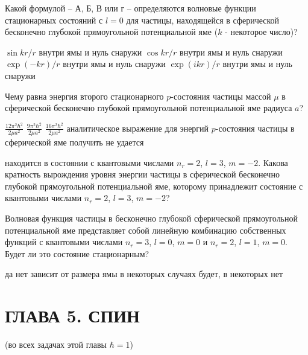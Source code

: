 \documentclass[11pt,a4paper]{exam}
\begin{document}
\begin{questions}
\question Какой формулой – А, Б, В или г – определяются волновые функции стационарных состояний с $l = 0$ для частицы, находящейся в сферической бесконечно глубокой прямоугольной потенциальной яме ($k$ - некоторое число)?
\begin{choices}
\choice $\sin kr/r$ внутри ямы и нуль снаружи        
\choice $\cos kr/r$ внутри ямы и нуль снаружи
\choice $\exp ( - kr)/r$ внутри ямы и нуль снаружи         
\choice $\exp (ikr)/r$ внутри ямы и нуль снаружи
\end{choices}

\question  Чему равна энергия второго стационарного $p$-состояния частицы массой $\mu $ в сферической бесконечно глубокой прямоугольной потенциальной яме радиуса $a$?
\begin{choices}
\choice $\frac{{12{\pi ^2}{\hbar ^2}}}{{2\mu {a^2}}}$         
\choice $\frac{{9{\pi ^2}{\hbar ^2}}}{{2\mu {a^2}}}$       
\choice $\frac{{16{\pi ^2}{\hbar ^2}}}{{2\mu {a^2}}}$
\choice аналитическое выражение для энергий $p$-состояния частицы в сферической яме получить не удается
\end{choices}

\question находится в состоянии с квантовыми числами ${n_r} = 2$, $l = 3$, $m =  - 2$. Какова кратность вырождения уровня энергии частицы в сферической бесконечно глубокой прямоугольной потенциальной яме, которому принадлежит состояние с квантовыми числами ${n_r} = 2$, $l = 3$, $m =  - 2$?
\begin{choices}
\end{choices}

\question Волновая функция частицы в бесконечно глубокой сферической прямоугольной потенциальной яме представляет собой линейную комбинацию собственных функций с квантовыми числами ${n_r} = 3$, $l = 0$, $m = 0$ и ${n_r} = 2$, $l = 1$, $m = 0$. Будет ли это состояние стационарным?
\begin{choices}
\choice да          
\choice нет            
\choice зависит от размера ямы
\choice в некоторых случаях будет, в некоторых нет
\end{choices}

\end{questions}


\section{ ГЛАВА 5. СПИН }
(во всех задачах этой главы $\hbar  = 1$)
\end{document}
